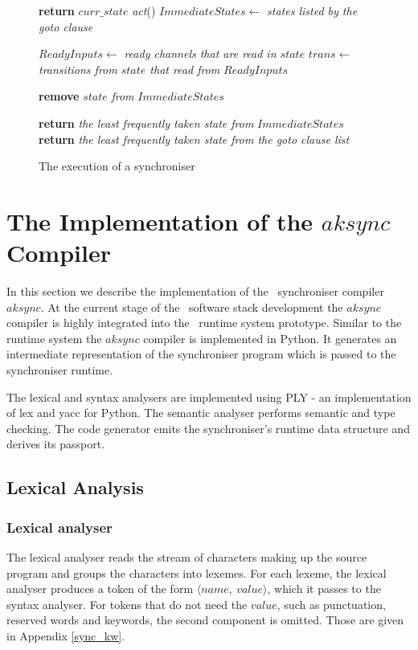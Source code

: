 \begin{figure}
{\begin{minipage}{\dimexpr\linewidth-2\fboxsep-2\fboxrule\relax}
\begin{algorithmic}[1]
    \State \textbf{return} $curr\_state$
  \EndIf
  \State \emph{act}()
  \State $ImmediateStates\gets$ \emph{states listed by the goto clause}
  \Statex

    \State $ReadyInputs\gets$ \emph{ready channels that are read in $state$}
    \State $trans\gets$ \emph{transitions from $state$ that read from} $ReadyInputs$

      \State \textbf{remove} $state$ \emph{from} $ImmediateStates$
    \EndIf
  \EndFor

    \State \textbf{return} \emph{the least frequently taken state from} $ImmediateStates$    
  \EndIf
  \State \textbf{return} \emph{the least frequently taken state from the goto clause list}
\EndFunction
\end{algorithmic}
\end{minipage}%
}
\caption{The execution of a synchroniser\label{fig:execod_alg}}
\end{figure}




\section{The Implementation of the $aksync$ Compiler}
In this section we describe the implementation of the \ak\ synchroniser compiler $aksync$. At the current stage of the \ak\ software stack development the $aksync$ compiler is highly integrated into the \ak\ runtime system prototype. Similar to the runtime system the $aksync$ compiler is implemented in Python. It generates an intermediate representation of the synchroniser program which is passed to the synchroniser runtime.

The lexical and syntax analysers are implemented using PLY \cite{ply} - an implementation of lex and yacc for Python. The semantic analyser performs semantic and type checking. The code generator emits the synchroniser's runtime data structure and derives its passport.


\subsection{Lexical Analysis}
  \subsubsection*{Lexical analyser}
The lexical analyser reads the stream of characters making up the source program and groups the characters into lexemes. For each lexeme, the lexical analyser produces a token of the form $\langle name, \: value \rangle$, which it passes to the syntax analyser. For tokens that do not need the $value$, such as punctuation, reserved words and keywords, the second component is omitted. Those are given in Appendix \ref{sync_kw}.

